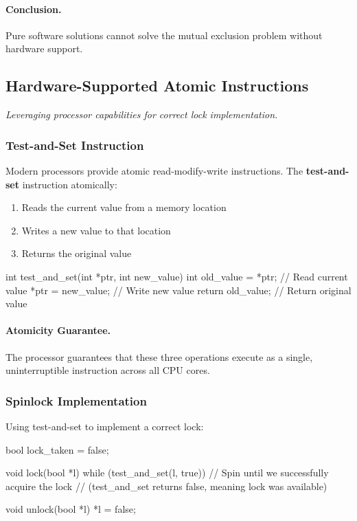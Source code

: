 \documentclass[../../compsys.tex]{subfiles}
\begin{document}
\paragraph{Conclusion.} Pure software solutions cannot solve the mutual exclusion problem without hardware support.

\subsection{Hardware-Supported Atomic Instructions}
\textit{Leveraging processor capabilities for correct lock implementation.}

\subsubsection{Test-and-Set Instruction}
Modern processors provide atomic read-modify-write instructions. The \textbf{test-and-set} instruction atomically:
\begin{enumerate}
  \item Reads the current value from a memory location
  \item Writes a new value to that location
  \item Returns the original value
\end{enumerate}

\begin{cc}
int test_and_set(int *ptr, int new_value) {
   int old_value = *ptr;     // Read current value
   *ptr = new_value;         // Write new value
   return old_value;         // Return original value
}
\end{cc}

\paragraph{Atomicity Guarantee.} The processor guarantees that these three operations execute as a single, uninterruptible instruction across all CPU cores.

\subsubsection{Spinlock Implementation}
Using test-and-set to implement a correct lock:

\begin{cc}
bool lock_taken = false;

void lock(bool *l) {
    while (test_and_set(l, true)) {
        // Spin until we successfully acquire the lock
        // (test_and_set returns false, meaning lock was available)
    }
}

void unlock(bool *l) {
    *l = false;
}
\end{cc}
\end{document}
